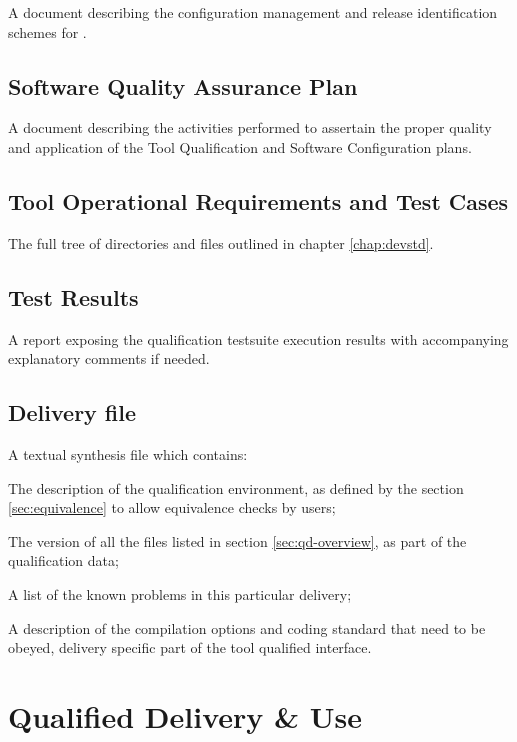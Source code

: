 \documentclass {report}
\begin{document}
A document describing the configuration management and release
identification schemes for \xcov{}.

\section{Software Quality Assurance Plan}

A document describing the activities performed to assertain the proper quality
and application of the Tool Qualification and Software Configuration plans.

\section{Tool Operational Requirements and Test Cases}

The full tree of directories and files outlined in chapter \ref{chap:devstd}.

\section{Test Results}

A report exposing the qualification testsuite execution results with
accompanying explanatory comments if needed.

\section{Delivery file}
\label{sec:delivery}

A textual synthesis file  which contains:

\begin{Itemize} 
\item%
  The description of the qualification environment, as defined by the section
  \ref{sec:equivalence} to allow equivalence checks by users;
\item%
  The version of all the files listed in section \ref{sec:qd-overview}, as
  part of the qualification data;
\item%
  A list of the known problems in this particular delivery;
\item%
  A description of the \gnatp{} compilation options and coding standard that
  need to be obeyed, delivery specific part of the tool qualified interface.
\end{Itemize}

\chapter{Qualified Delivery \& Use}
\label{sec:qualified-use}
\end{document}

